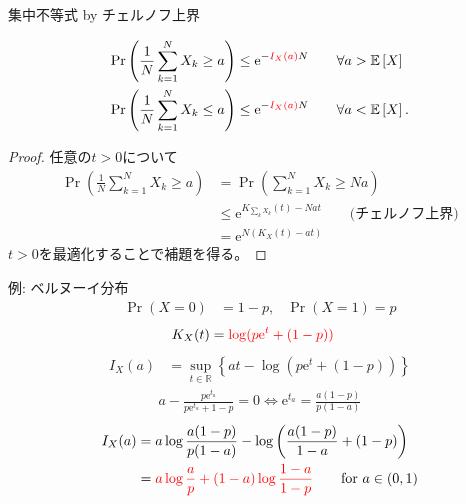 \documentclass[lualatex,handout]{beamer}
\newcommand{\emm}[1]{\textcolor{red}{#1}}
\newcommand{\expt}[1]{\mathbb{E}\left[#1\right]}
\theoremstyle{definition}
\begin{document}
\begin{frame}{集中不等式 by チェルノフ上界}
\small
\begin{theorem}[集中不等式]
\vspace{-1em}
\begin{align*}
\Pr\left(\frac1N\sum_{k=1}^N X_k\ge a\right) &\le \mathrm{e}^{-\emm{I_X(a)}N}\qquad\forall a>\expt{X}\\
\Pr\left(\frac1N\sum_{k=1}^N X_k\le a\right) &\le \mathrm{e}^{-\emm{I_X(a)}N}\qquad\forall a<\expt{X}.
\end{align*}
\end{theorem}
\begin{proof}
任意の$t>0$について
\begin{align*}
\Pr\left(\frac1N\sum_{k=1}^N X_k\ge a\right) &=
\Pr\left(\sum_{k=1}^N X_k\ge Na\right)\\
&\le\mathrm{e}^{K_{\sum_k X_k}(t) - Nat}\qquad\text{(チェルノフ上界)}\\
&=\mathrm{e}^{N(K_X(t) - at)}
\end{align*}
$t>0$を最適化することで補題を得る。
\end{proof}
\end{frame}



\begin{frame}{例: ベルヌーイ分布}
\begin{align*}
\Pr(X=0) &= 1-p,&\Pr(X=1)=p
\end{align*}
\begin{align*}
K_X(t) &= \emm{\log(p\mathrm{e}^t + (1-p))}
\end{align*}
\begin{align*}
I_X(a) &= \sup_{t\in\mathbb{R}} \left\{ at - \log(p\mathrm{e}^t+(1-p))\right\}
\end{align*}
\begin{align*}
a - \frac{p\mathrm{e}^{t_a}}{p\mathrm{e}^{t_a}+1-p} = 0
\iff \mathrm{e}^{t_a} = \frac{a(1-p)}{p(1-a)}
\end{align*}
\begin{align*}
I_X(a) &= a\log\frac{a(1-p)}{p(1-a)} - \log\left(\frac{a(1-p)}{1-a} + (1-p)\right)\\
 &= \emm{a\log\frac{a}{p} + (1-a)\log\frac{1-a}{1-p}} \qquad\text{for } a\in(0,1)
\end{align*}
\end{frame}
\end{document}
